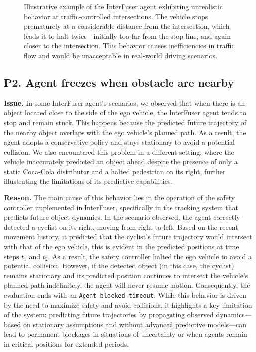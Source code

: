 \begin{figure}[htbp]
\begin{subfigure}[b]{0.45\textwidth}
        \label{fig:RS10_premature_second_stop}
    \end{subfigure}
    \caption{Illustrative example of the InterFuser agent exhibiting unrealistic behavior at traffic-controlled intersections. The vehicle stops prematurely at a considerable distance from the intersection, which leads it to halt twice—initially too far from the stop line, and again closer to the intersection. This behavior causes inefficiencies in traffic flow and would be unacceptable in real-world driving scenarios.}
    \label{fig:interfuser_premature_stopping}
\end{figure}

\subsection{P2. Agent freezes when obstacle are nearby}
\noindent\textbf{Issue.} In some InterFuser agent's scenarios, we observed that when there is an object located close to the side of the ego vehicle, the InterFuser agent tends to stop and remain stuck. This happens because the predicted future trajectory of the nearby object overlaps with the ego vehicle's planned path. As a result, the agent adopts a conservative policy and stays stationary to avoid a potential collision.
We also encountered this problem in a different setting, where the vehicle inaccurately predicted an object ahead despite the presence of only a static Coca-Cola distributor and a halted pedestrian on its right, further illustrating the limitations of its predictive capabilities.

\noindent\textbf{Reason.} The main cause of this behavior lies in the operation of the safety controller implemented in InterFuser, specifically in the tracking system that predicts future object dynamics. In the scenario observed, the agent correctly detected a cyclist on its right, moving from right to left. Based on the recent movement history, it predicted that the cyclist's future trajectory would intersect with that of the ego vehicle, this is evident in the predicted positions at time steps $t_{1}$ and $t_{2}$. As a result, the safety controller halted the ego vehicle to avoid a potential collision. However, if the detected object (in this case, the cyclist) remains stationary and its predicted position continues to intersect the vehicle's planned path indefinitely, the agent will never resume motion. Consequently, the evaluation ends with an \texttt{Agent blocked timeout}.
While this behavior is driven by the need to maximize safety and avoid collisions, it highlights a key limitation of the system: predicting future trajectories by propagating observed dynamics—based on stationary assumptions and without advanced predictive models—can lead to permanent blockages in situations of uncertainty or when agents remain in critical positions for extended periods. 

